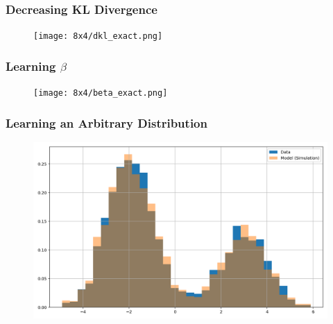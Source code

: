 \documentclass{beamer}
\begin{document}
\begin{frame}
    \frametitle{Decreasing KL Divergence}
    \begin{figure}
        \texttt{[image: 8x4/dkl\_exact.png]}
    \end{figure}
\end{frame}
\begin{frame}
    \frametitle{Learning \( \beta \)}
    \begin{figure}
        \texttt{[image: 8x4/beta\_exact.png]}
    \end{figure}
\end{frame}
\begin{frame}
    \frametitle{Learning an Arbitrary Distribution}
    \begin{figure}
        \includegraphics[width=1\linewidth]{8x4/hist_comparison_exact.png}
    \end{figure}
\end{frame}
\end{document}
